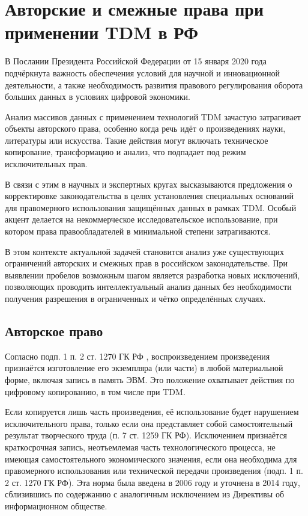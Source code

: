 \section{Авторские и смежные права при применении TDM в РФ}

В Послании Президента Российской Федерации от 15 января 2020 года подчёркнута
важность обеспечения условий для научной и инновационной деятельности, а также
необходимость развития правового регулирования оборота больших данных в
условиях цифровой экономики.

Анализ массивов данных с применением технологий TDM зачастую затрагивает
объекты авторского права, особенно когда речь идёт о произведениях науки,
литературы или искусства. Такие действия могут включать техническое
копирование, трансформацию и анализ, что подпадает под режим исключительных
прав.

В связи с этим в научных и экспертных кругах высказываются предложения о
корректировке законодательства в целях установления специальных оснований для
правомерного использования защищённых данных в рамках TDM. Особый акцент
делается на некоммерческое исследовательское использование, при котором права
правообладателей в минимальной степени затрагиваются.

В этом контексте актуальной задачей становится анализ уже существующих
ограничений авторских и смежных прав в российском законодательстве. При
выявлении пробелов возможным шагом является разработка новых исключений,
позволяющих проводить интеллектуальный анализ данных без необходимости
получения разрешения в ограниченных и чётко определённых случаях.

\subsection*{Авторское право}

Согласно подп. 1 п. 2 ст. 1270 ГК РФ \cite{gk_rf}, воспроизведением
произведения признаётся изготовление его экземпляра (или части) в любой
материальной форме, включая запись в память ЭВМ. Это положение охватывает
действия по цифровому копированию, в том числе при TDM.

Если копируется лишь часть произведения, её использование будет нарушением
исключительного права, только если она представляет собой самостоятельный
результат творческого труда (п. 7 ст. 1259 ГК РФ). Исключением признаётся
краткосрочная запись, неотъемлемая часть технологического процесса, не имеющая
самостоятельного экономического значения, если она необходима для правомерного
использования или технической передачи произведения (подп. 1 п. 2 ст. 1270 ГК
РФ). Эта норма была введена в 2006 году и уточнена в 2014 году, сблизившись по
содержанию с аналогичным исключением из Директивы об информационном обществе.

